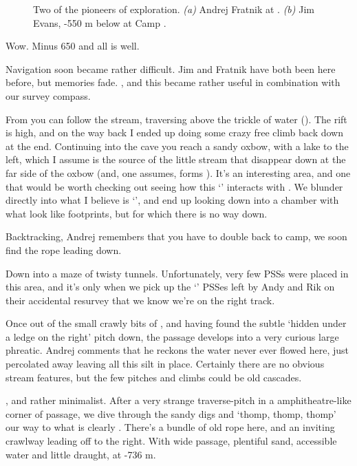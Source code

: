 \begin{figure}[t]
\begin{subfigure}[t]{0.49\textwidth}
			\caption{}\label{jim x-ray}
		\end{subfigure}
		\caption{Two of the pioneers of  exploration.
  \textit{(a)} Andrej Fratnik at . 
  \textit{(b)} Jim Evans, -550 m below at Camp . }
	\end{figure}


Wow. Minus 650 and all is well.

Navigation soon became rather difficult. Jim and Fratnik have both been
here before, but memories fade. , and this became rather useful
in combination with our survey compass.

From  you can follow the stream,
traversing above the trickle of water (). The rift is high,
and on the way back I ended up doing some crazy free climb back down at
the end. Continuing into the cave you reach a sandy oxbow, with a lake
to the left, which I assume is the source of the little stream that
disappear down at the far side of the oxbow (and, one assumes, forms
). It's an interesting area, and one that would be worth
checking out seeing how this `' interacts with . We blunder directly into what I believe is `',
and end up looking down into a chamber with what look like footprints,
but for which there is no way down.

Backtracking, Andrej remembers that you have to double back to camp, we soon find the rope leading down.

Down into a maze of twisty tunnels. Unfortunately, very few PSSs were
placed in this area, and it's only when we pick up the `' PSSes
left by Andy and Rik on their accidental resurvey that we know we're on
the right track.

Once out of the small crawly bits of , and having found the
subtle `hidden under a ledge on the right' pitch down, the passage
develops into a very curious large phreatic. Andrej comments that he
reckons the water never ever flowed here, just percolated away leaving
all this silt in place. Certainly there are no obvious stream features,
but the few pitches and climbs could be old cascades.

, and rather minimalist. After a very
strange traverse-pitch in a amphitheatre-like corner of passage, we dive
through the sandy digs and `thomp, thomp, thomp' our way to what is
clearly . There's a bundle of old rope here, and an
inviting crawlway leading off to the right. With wide passage, plentiful
sand, accessible water and little draught,  at -736 m.

